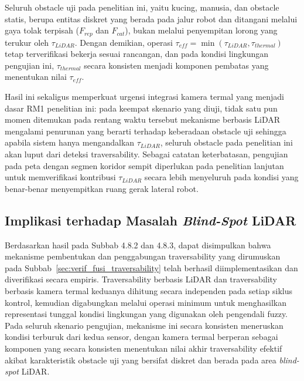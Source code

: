 Seluruh obstacle uji pada penelitian ini, yaitu kucing, manusia, dan obstacle statis, berupa entitas diskret yang berada pada jalur robot dan ditangani melalui gaya tolak terpisah ($F_{rep}$ dan $F_{cat}$), bukan melalui penyempitan lorong yang terukur oleh $\tau_{LiDAR}$. Dengan demikian, operasi $\tau_{eff} = \min(\tau_{LiDAR}, \tau_{thermal})$ tetap terverifikasi bekerja sesuai rancangan, dan pada kondisi lingkungan pengujian ini, $\tau_{thermal}$ secara konsisten menjadi komponen pembatas yang menentukan nilai $\tau_{eff}$.

Hasil ini sekaligus memperkuat urgensi integrasi kamera termal yang menjadi dasar RM1 penelitian ini: pada keempat skenario yang diuji, tidak satu pun momen ditemukan pada rentang waktu tersebut mekanisme berbasis LiDAR mengalami penurunan yang berarti terhadap keberadaan obstacle uji sehingga apabila sistem hanya mengandalkan $\tau_{LiDAR}$, seluruh obstacle pada penelitian ini akan luput dari deteksi traversability. Sebagai catatan keterbatasan, pengujian pada peta dengan segmen koridor sempit diperlukan pada penelitian lanjutan untuk memverifikasi kontribusi $\tau_{LiDAR}$ secara lebih menyeluruh pada kondisi yang benar-benar menyempitkan ruang gerak lateral robot.

\subsection{Implikasi terhadap Masalah \textit{Blind-Spot} LiDAR}

Berdasarkan hasil pada Subbab 4.8.2 dan 4.8.3, dapat disimpulkan bahwa mekanisme pembentukan dan penggabungan traversability yang dirumuskan pada Subbab~\ref{sec:verif_fusi_traversability} telah berhasil diimplementasikan dan diverifikasi secara empiris. Traversability berbasis LiDAR dan traversability berbasis kamera termal keduanya dihitung secara independen pada setiap siklus kontrol, kemudian digabungkan melalui operasi minimum untuk menghasilkan representasi tunggal kondisi lingkungan yang digunakan oleh pengendali fuzzy. Pada seluruh skenario pengujian, mekanisme ini secara konsisten meneruskan kondisi terburuk dari kedua sensor, dengan kamera termal berperan sebagai komponen yang secara konsisten menentukan nilai akhir traversability efektif akibat karakteristik obstacle uji yang bersifat diskret dan berada pada area \textit{blind-spot} LiDAR.